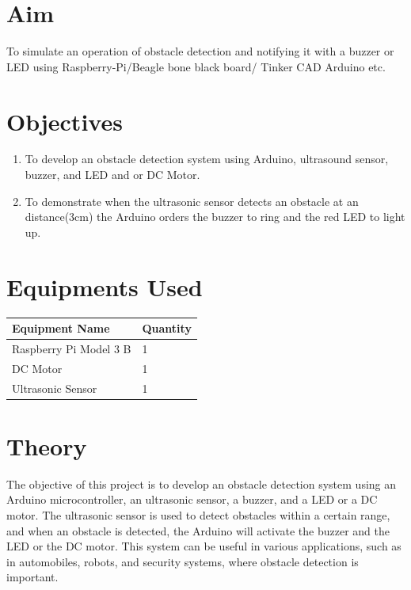 \documentclass[11pt]{article}
\begin{document}
\tableofcontents
\thispagestyle{empty}
\clearpage

\setcounter{page}{1}

\section{Aim}

To simulate an operation of obstacle detection and notifying it with a buzzer or
LED using Raspberry-Pi/Beagle bone black board/ Tinker CAD Arduino etc.

\section{Objectives}
\begin{enumerate}
	\item To develop an obstacle detection system using Arduino, ultrasound sensor,
	      buzzer, and LED and or DC Motor.
	\item To demonstrate when the ultrasonic sensor detects an obstacle at an distance(3cm)
	      the Arduino orders the buzzer to ring and the red LED to light up.
\end{enumerate}

\section{Equipments Used}

\begin{table}[H]
	\begin{tabular}{|l|l|}
		\hline
		\textbf{Equipment Name} & \textbf{Quantity} \\ \hline
		Raspberry Pi Model 3 B  & 1                 \\ \hline
		DC Motor                & 1                 \\ \hline
		Ultrasonic Sensor       & 1                 \\ \hline
	\end{tabular}
\end{table}

\section{Theory}
The objective of this project is to develop an obstacle detection system using an Arduino microcontroller, an ultrasonic sensor, a buzzer, and a LED or a DC motor. The ultrasonic sensor is used to detect obstacles within a certain range, and when an obstacle is detected, the Arduino will activate the buzzer and the LED or the DC motor. This system can be useful in various applications, such as in automobiles, robots, and security systems, where obstacle detection is important.\\
\end{document}
